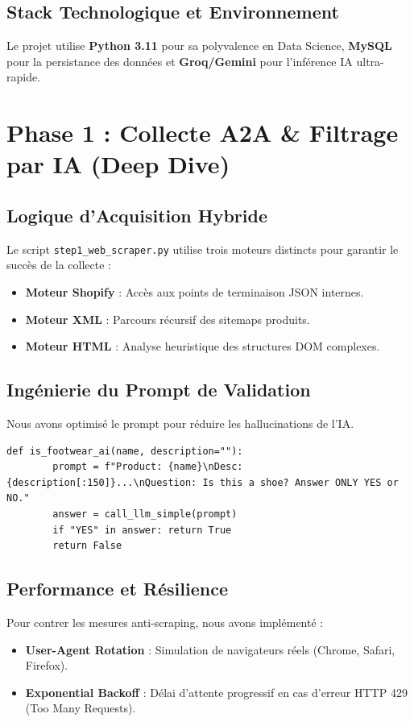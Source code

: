 \documentclass[11pt,a4paper,oneside]{report}
\begin{document}
    \section{Stack Technologique et Environnement}
    Le projet utilise \textbf{Python 3.11} pour sa polyvalence en Data Science, \textbf{MySQL} pour la persistance des données et \textbf{Groq/Gemini} pour l'inférence IA ultra-rapide.

    \chapter{Phase 1 : Collecte A2A \& Filtrage par IA (Deep Dive)}
    \section{Logique d'Acquisition Hybride}
    Le script \texttt{step1\_web\_scraper.py} utilise trois moteurs distincts pour garantir le succès de la collecte :
    \begin{itemize}
        \item \textbf{Moteur Shopify} : Accès aux points de terminaison JSON internes.
        \item \textbf{Moteur XML} : Parcours récursif des sitemaps produits.
        \item \textbf{Moteur HTML} : Analyse heuristique des structures DOM complexes.
    \end{itemize}

    \section{Ingénierie du Prompt de Validation}
    Nous avons optimisé le prompt pour réduire les hallucinations de l'IA.
    \begin{lstlisting}[caption=Logic de filtrage sémantique]
    def is_footwear_ai(name, description=""):
        prompt = f"Product: {name}\nDesc: {description[:150]}...\nQuestion: Is this a shoe? Answer ONLY YES or NO."
        answer = call_llm_simple(prompt)
        if "YES" in answer: return True
        return False
    \end{lstlisting}

    \section{Performance et Résilience}
    Pour contrer les mesures anti-scraping, nous avons implémenté :
    \begin{itemize}
        \item \textbf{User-Agent Rotation} : Simulation de navigateurs réels (Chrome, Safari, Firefox).
        \item \textbf{Exponential Backoff} : Délai d'attente progressif en cas d'erreur HTTP 429 (Too Many Requests).
    \end{itemize}
\end{document}
